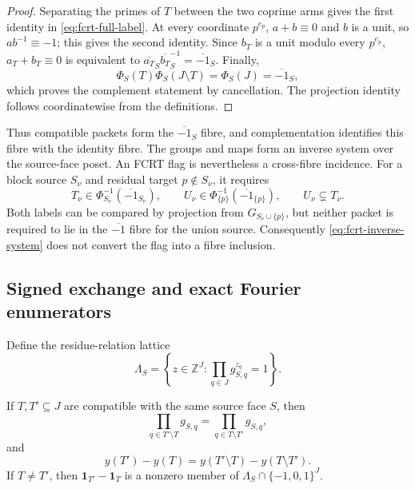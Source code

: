 \begin{proof}
Separating the primes of $T$ between the two coprime arms gives the first
identity in \eqref{eq:fcrt-full-label}.  At every coordinate $p^{e_p}$,
$a+b\equiv0$ and $b$ is a unit, so $ab^{-1}\equiv-1$; this gives the second
identity.  Since $b_T$ is a unit modulo every $p^{e_p}$,
$a_T+b_T\equiv0$ is equivalent to
$\overline{a_T}_S\overline{b_T}_S^{-1}=\overline{-1}_S$.
Finally,
\[
 \Phi_S(T)\Phi_S(J\setminus T)=\Phi_S(J)=\overline{-1}_S,
\]
which proves the complement statement by cancellation.  The projection
identity follows coordinatewise from the definitions.
\end{proof}

Thus compatible packets form the $\overline{-1}_S$ fibre, and complementation
identifies this fibre with the identity fibre.  The groups and maps form an
inverse system over the source-face poset.  An FCRT flag is nevertheless a
cross-fibre incidence.  For a block source $S_\nu$ and residual target
$p\notin S_\nu$, it requires
\[
 T_\nu\in\Phi_{S_\nu}^{-1}(\overline{-1}_{S_\nu}),
 \qquad
 U_\nu\in\Phi_{\{p\}}^{-1}(\overline{-1}_{\{p\}}),
 \qquad U_\nu\subsetneq T_\nu.
\tag{FCRT-26}\label{eq:fcrt-cross-fibre}
\]
Both labels can be compared by projection from
$G_{S_\nu\cup\{p\}}$, but neither packet is required to lie in the
$\overline{-1}$ fibre for the union source.  Consequently
\eqref{eq:fcrt-inverse-system} does not convert the flag into a fibre
inclusion.

\subsection{Signed exchange and exact Fourier enumerators}

Define the residue-relation lattice
\[
 \Lambda_S=\left\{z\in\mathbb Z^J:
              \prod_{q\in J}g_{S,q}^{z_q}=1\right\}.
\tag{FCRT-27}\label{eq:fcrt-residue-lattice}
\]

\begin{proposition}
\label{prop:fcrt-signed-exchange}
If $T,T'\subseteq J$ are compatible with the same source face $S$, then
\[
 \prod_{q\in T'\setminus T}g_{S,q}
 =\prod_{q\in T\setminus T'}g_{S,q},
\tag{FCRT-28}\label{eq:fcrt-signed-product}
\]
and
\[
 y(T')-y(T)=y(T'\setminus T)-y(T\setminus T').
\tag{FCRT-29}\label{eq:fcrt-signed-weight}
\]
If $T\ne T'$, then
$\mathbf 1_{T'}-\mathbf 1_T$ is a nonzero member of
$\Lambda_S\cap\{-1,0,1\}^J$.
\end{proposition}

